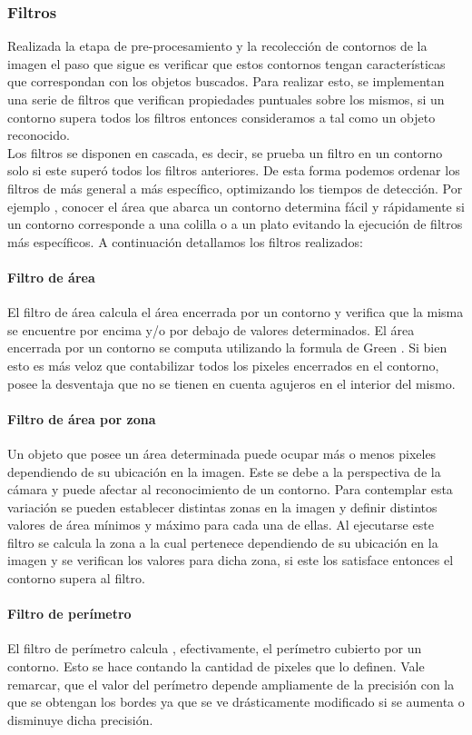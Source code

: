 	

	\subsubsection{Filtros}
	Realizada la etapa de pre-procesamiento y la recolección de contornos de la imagen el paso que sigue es verificar que estos
	contornos tengan características que correspondan con  los 
	objetos buscados. Para realizar esto, se implementan una serie de filtros que verifican propiedades
	puntuales sobre los mismos, si un contorno supera todos los filtros entonces consideramos a tal como un objeto reconocido. \\
	\indent Los filtros se disponen en cascada, es decir, se prueba un filtro en un contorno solo si este superó todos los filtros 
	anteriores. De esta forma podemos ordenar los filtros de más general a más específico, optimizando los tiempos de detección. Por ejemplo , conocer 
	el área que abarca un contorno determina fácil y rápidamente si un contorno corresponde a una colilla o a un plato evitando la ejecución
	de filtros más específicos. A continuación detallamos los filtros realizados:
	\paragraph{Filtro de área}
	El filtro de área calcula el área encerrada por un contorno y verifica que la misma se encuentre por encima y/o por debajo
	de valores determinados. El área encerrada por un contorno se computa utilizando la formula de Green \cite{greenwolfram}.
	Si bien esto es más veloz que contabilizar todos los pixeles encerrados en el contorno, posee la desventaja que no se tienen en cuenta agujeros
	en el interior del mismo.
	\paragraph{Filtro de área por zona}
	Un objeto que posee un área determinada puede ocupar más o menos pixeles dependiendo de su ubicación en la imagen. Este se debe a la 
	perspectiva de la cámara y puede afectar al reconocimiento de un contorno. Para contemplar esta variación se pueden establecer distintas
	zonas en la imagen y definir distintos valores de área mínimos y máximo para cada una de ellas. Al ejecutarse este filtro se calcula la
	zona a la cual pertenece dependiendo de su ubicación en la imagen y se verifican los valores para dicha zona, si este los satisface entonces
	el contorno supera al filtro.
	\paragraph{Filtro de perímetro}
	El filtro de perímetro calcula , efectivamente, el perímetro cubierto por un contorno. Esto se hace contando la cantidad de pixeles que lo definen.
	Vale remarcar, que el valor del perímetro depende ampliamente de la precisión con la que se obtengan los bordes ya que se ve drásticamente modificado 
	si se aumenta o disminuye dicha precisión.
